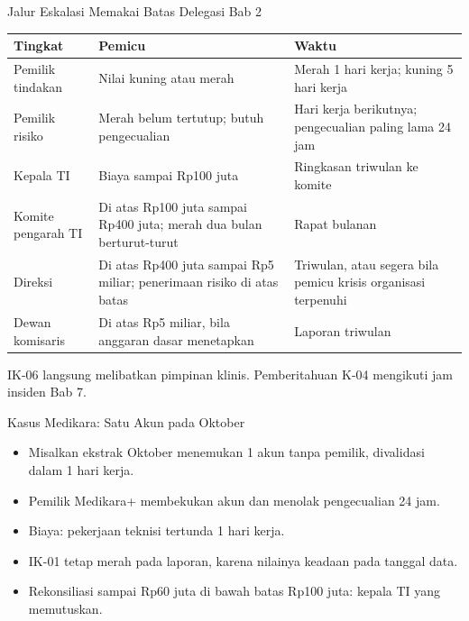 \documentclass[aspectratio=169, table, 12pt]{beamer}
\begin{document}
\begin{frame}{{\Large Jalur Eskalasi Memakai Batas Delegasi Bab 2}}
  \vspace{2pt}
  \scriptsize
  \begin{tabularx}{\textwidth}{|>{\raggedright\arraybackslash}p{}|>{\raggedright\arraybackslash}X|>{\raggedright\arraybackslash}p{}|}
    \hline
    \textbf{Tingkat} & \textbf{Pemicu} & \textbf{Waktu} \\ \hline
    Pemilik tindakan & Nilai kuning atau merah & Merah 1 hari kerja; kuning 5 hari kerja \\ \hline
    Pemilik risiko & Merah belum tertutup; butuh pengecualian & Hari kerja berikutnya; pengecualian
    paling lama 24 jam \\ \hline
    Kepala TI & Biaya sampai Rp100 juta & Ringkasan triwulan ke komite \\ \hline
    Komite pengarah TI & Di atas Rp100 juta sampai Rp400 juta; merah dua bulan berturut-turut &
    Rapat bulanan \\ \hline
    Direksi & Di atas Rp400 juta sampai Rp5 miliar; penerimaan risiko di atas batas & Triwulan,
    atau segera bila pemicu krisis organisasi terpenuhi \\ \hline
    Dewan komisaris & Di atas Rp5 miliar, bila anggaran dasar menetapkan & Laporan triwulan \\
    \hline
  \end{tabularx}

  \vspace{6pt}
  IK-06 langsung melibatkan pimpinan klinis. Pemberitahuan K-04 mengikuti jam insiden Bab 7.
\end{frame}

\begin{frame}{{\Large Kasus Medikara: Satu Akun pada Oktober}}
  \vspace{6pt}
  \small
  \begin{itemize}
    \item Misalkan ekstrak Oktober menemukan 1 akun tanpa pemilik, divalidasi dalam 1 hari kerja.
    \item Pemilik Medikara+ membekukan akun dan menolak pengecualian 24 jam.
    \item Biaya: pekerjaan teknisi tertunda 1 hari kerja.
    \item IK-01 tetap merah pada laporan, karena nilainya keadaan pada tanggal data.
    \item Rekonsiliasi sampai Rp60 juta di bawah batas Rp100 juta: kepala TI yang memutuskan.
  \end{itemize}
\end{frame}
\end{document}
